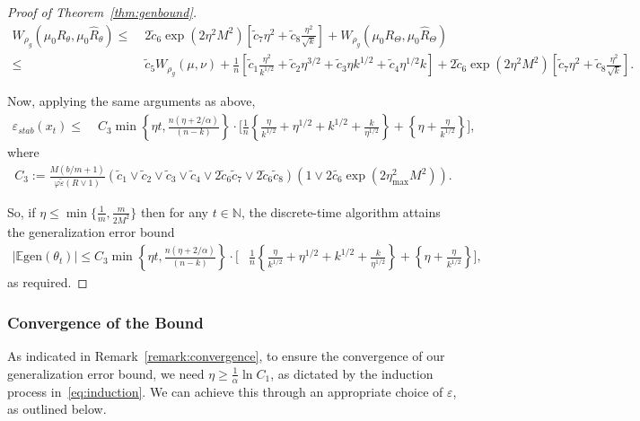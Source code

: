 \documentclass{article}
\begin{document}
\begin{proof}[Proof of Theorem~\ref{thm:genbound}]
	\begin{align*}
		W_{\rho_g}(\mu_0 R_\theta , \mu_0 \widehat{R}_\theta) \leq&\; 2\tilde{c}_6 \exp(2\eta^2 M^2 ) \left[ \tilde{c}_7  \eta^2+ \tilde{c}_8  \frac{\eta^2}{\sqrt{k}}\right]+ W_{\rho_g} (\mu_0 R_\Theta, \mu_0 \widehat{R}_\Theta)\\
		\leq&\; \tilde{c}_5 W_{\rho_g}(\mu, \nu) + \frac{1}{n} \left[\tilde{c}_1 \frac{\eta^2}{k^{1/2}}  + \tilde{c}_2 \eta^{3/2} + \tilde{c}_3 \eta k^{1/2}  +  \tilde{c}_4 \eta^{1/2} k \right]+ 2\tilde{c}_6 \exp(2\eta^2 M^2 )\left[ \tilde{c}_7   \eta^2+ \tilde{c}_8 \frac{\eta^2}{\sqrt{k}} \right].
	\end{align*}
	
	Now, applying the same arguments as above,
	\begin{align*}
		\varepsilon_{stab} (x_t) \leq&\;  C_3 \min \left\{\eta t, \frac{n(\eta +2/\alpha)}{(n-k)} \right\}  \cdot \bigg[ \frac{1}{n}\left\{\frac{\eta}{k^{1/2}}  +\eta^{1/2} + k^{1/2}  +  \frac{k}{\eta^{1/2}} \right\} + \left\{\eta  + \frac{\eta}{k^{1/2}}\right\}\bigg],
	\end{align*}
	where
	\begin{align}\label{const:C3}
		C_3 :=\frac{M (b/m +1)}{\varphi \widetilde{\varepsilon} (R \vee 1)}  (\tilde{c}_1 \vee \tilde{c}_2 \vee \tilde{c}_3 \vee \tilde{c}_4 \vee 2\tilde{c}_6\tilde{c}_7 \vee 2\tilde{c}_6\tilde{c}_8 )(1 \vee 2\tilde{c_6} \exp(2 \eta_{\max}^2 M^2)).
	\end{align}
	
	So, if $\eta \leq \min\{\frac{1}{m}, \frac{m}{2M^2}\}$ then for any $t \in \mathbb{N}$, the discrete-time algorithm attains the generalization error bound
	\begin{align*}
		|\mathbb{E} \mathrm{gen}(\theta_t)| \leq C_3  \min \left\{\eta t, \frac{n(\eta +2/\alpha)}{(n-k)} \right\}  \cdot \bigg[&\frac{1}{n}\left\{\frac{\eta}{k^{1/2}}  +\eta^{1/2} + k^{1/2}  +  \frac{k}{\eta^{1/2}} \right\} + \left\{\eta  + \frac{\eta}{k^{1/2}}\right\}\bigg],
	\end{align*}
	as required.
\end{proof}

\subsubsection{Convergence of the Bound}\label{appendix:AlphaandEpsilon}

As indicated in Remark~\ref{remark:convergence}, to ensure the convergence of our generalization error bound, we need $\eta \geq \frac{1}{\alpha}\ln{C_1}$, as dictated by the induction process in~\eqref{eq:induction}. We can achieve this through an appropriate choice of $\varepsilon$, as outlined below.
\end{document}
